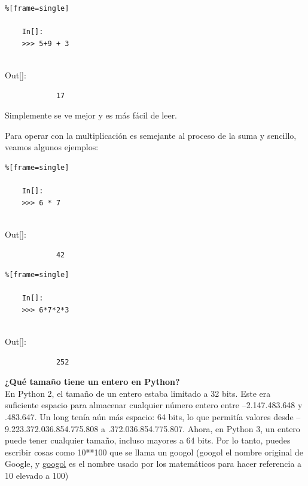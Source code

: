 \begin{lstlisting}%[frame=single]
	
	In[]:
	>>> 5+9 + 3
	
\end{lstlisting}

{\ttfamily\scriptsize\scriptsize 
	\hspace{-0.65cm}Out[]:\vspace{-0.15cm}	
	{\color{blue} 	
		\begin{verbatim}
			17
		\end{verbatim}
}}
\vspace{-0.5cm}
\begin{flushleft}
	Simplemente se ve mejor y es más fácil de leer.
\end{flushleft}
\vspace{-0.15cm}	             %
Para operar con la multiplicación es semejante al proceso de la suma  y sencillo, veamos algunos  ejemplos:

\begin{lstlisting}%[frame=single]
	
	In[]:
	>>> 6 * 7
	
\end{lstlisting}

{\ttfamily\scriptsize\scriptsize 
	\hspace{-0.65cm}Out[]:\vspace{-0.15cm}	
	{\color{blue} 	
		\begin{verbatim}
			42
		\end{verbatim}
}}

\begin{lstlisting}%[frame=single]
	
	In[]:
	>>> 6*7*2*3
	
\end{lstlisting}

{\ttfamily\scriptsize\scriptsize 
	\hspace{-0.65cm}Out[]:\vspace{-0.15cm}	
	{\color{blue} 	
		\begin{verbatim}
			252
		\end{verbatim}
}}


{\bf ¿Qué tamaño tiene un entero en Python?}\\

En Python 2, el tamaño de un entero estaba limitado a 32 bits. Este era suficiente espacio para almacenar
cualquier número entero entre {\ttfamily –2.147.483.648} y {.483.647}.  Un {\ttfamily long} tenía aún más espacio: 64 bits, lo que permitía valores desde {\ttfamily –9.223.372.036.854.775.808}  a 
{.372.036.854.775.807}. Ahora, en Python 3,  un entero puede tener cualquier tamaño, incluso mayores a 64 bits. Por lo tanto, puedes escribir cosas como 10**100 que se llama un googol (googol el nombre original de Google, y      \href{https://www.quora.com/What-was-Google-called-before-it-became-Google}{\color{vino} googol}
es el nombre usado por los matemáticos para hacer referencia a 10 elevado a 100)

